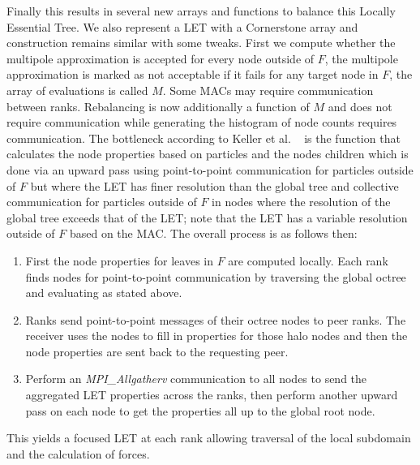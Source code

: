 Finally this results in several new arrays and functions to balance this Locally Essential Tree. We also represent a LET with a Cornerstone array and construction remains similar with some tweaks. First we compute whether the multipole approximation is accepted for every node outside of $F$, the multipole approximation is marked as not acceptable if it fails for any target node in $F$, the array of evaluations is called $M$. Some MACs may require communication between ranks. Rebalancing is now additionally a function of $M$ and does not require communication while generating the histogram of node counts requires communication. The bottleneck according to Keller et al. ~\cite{cornerstone} is the function that calculates the node properties based on particles and the nodes children which is done via an upward pass using point-to-point communication for particles outside of $F$ but where the LET has finer resolution than the global tree and collective communication for particles outside of $F$ in nodes where the resolution of the global tree exceeds that of the LET; note that the LET has a variable resolution outside of $F$ based on the MAC. The overall process is as follows then:
\begin{enumerate}
    \item First the node properties for leaves in $F$ are computed locally. Each rank finds nodes for point-to-point communication by traversing the global octree and evaluating as stated above. 
    \item Ranks send point-to-point messages of their octree nodes to peer ranks. The receiver uses the nodes to fill in properties for those halo nodes and then the node properties are sent back to the requesting peer.
    \item Perform an \textit{MPI\_Allgatherv} communication to all nodes to send the aggregated LET properties across the ranks, then perform another upward pass on each node to get the properties all up to the global root node.
\end{enumerate}

This yields a focused LET at each rank allowing traversal of the local subdomain and the calculation of forces. 
